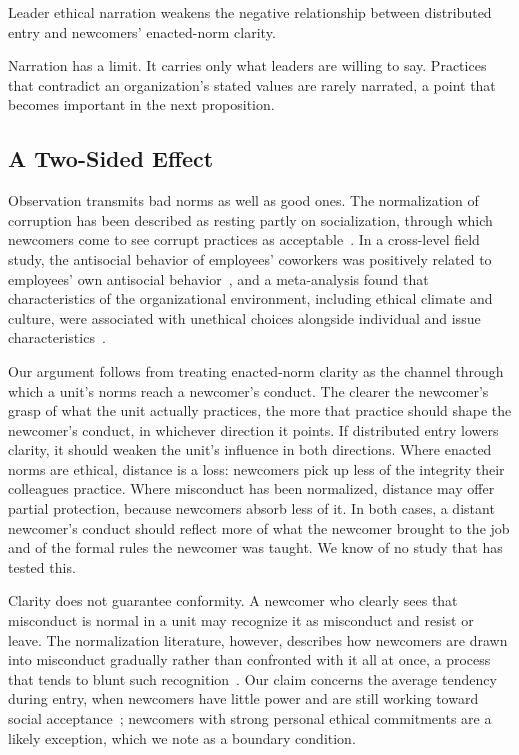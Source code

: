 \begin{proposition}
Leader ethical narration weakens the negative relationship between distributed entry and newcomers' enacted-norm clarity.
\end{proposition}

Narration has a limit. It carries only what leaders are willing to say. Practices that contradict an organization's stated values are rarely narrated, a point that becomes important in the next proposition.

\subsection{A Two-Sided Effect}

Observation transmits bad norms as well as good ones. The normalization of corruption has been described as resting partly on socialization, through which newcomers come to see corrupt practices as acceptable~\citep{ashforth2003normalization}. In a cross-level field study, the antisocial behavior of employees' coworkers was positively related to employees' own antisocial behavior~\citep{robinson1998monkey}, and a meta-analysis found that characteristics of the organizational environment, including ethical climate and culture, were associated with unethical choices alongside individual and issue characteristics~\citep{kishgephart2010bad}.

Our argument follows from treating enacted-norm clarity as the channel through which a unit's norms reach a newcomer's conduct. The clearer the newcomer's grasp of what the unit actually practices, the more that practice should shape the newcomer's conduct, in whichever direction it points. If distributed entry lowers clarity, it should weaken the unit's influence in both directions. Where enacted norms are ethical, distance is a loss: newcomers pick up less of the integrity their colleagues practice. Where misconduct has been normalized, distance may offer partial protection, because newcomers absorb less of it. In both cases, a distant newcomer's conduct should reflect more of what the newcomer brought to the job and of the formal rules the newcomer was taught. We know of no study that has tested this.

Clarity does not guarantee conformity. A newcomer who clearly sees that misconduct is normal in a unit may recognize it as misconduct and resist or leave. The normalization literature, however, describes how newcomers are drawn into misconduct gradually rather than confronted with it all at once, a process that tends to blunt such recognition~\citep{ashforth2003normalization}. Our claim concerns the average tendency during entry, when newcomers have little power and are still working toward social acceptance~\citep{bauer2007newcomer}; newcomers with strong personal ethical commitments are a likely exception, which we note as a boundary condition.

